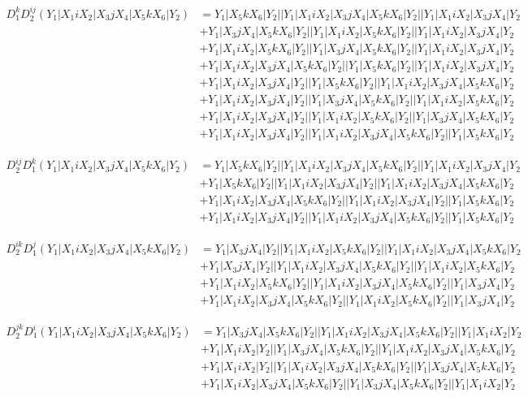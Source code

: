 \documentclass{article}[12pt]
\begin{document}
\begin{align*}
D_1^kD_2^{ij}(Y_1|X_1iX_2|X_3jX_4|X_5kX_6|Y_2)& =Y_1|X_5kX_6|Y_2||Y_1|X_1iX_2|X_3jX_4|X_5kX_6|Y_2||Y_1|X_1iX_2|X_3jX_4|Y_2\\ 
 & +Y_1|X_3jX_4|X_5kX_6|Y_2||Y_1|X_1iX_2|X_5kX_6|Y_2||Y_1|X_1iX_2|X_3jX_4|Y_2\\ 
 & +Y_1|X_1iX_2|X_5kX_6|Y_2||Y_1|X_3jX_4|X_5kX_6|Y_2||Y_1|X_1iX_2|X_3jX_4|Y_2\\ 
 & +Y_1|X_1iX_2|X_3jX_4|X_5kX_6|Y_2||Y_1|X_5kX_6|Y_2||Y_1|X_1iX_2|X_3jX_4|Y_2\\ 
 & +Y_1|X_1iX_2|X_3jX_4|Y_2||Y_1|X_5kX_6|Y_2||Y_1|X_1iX_2|X_3jX_4|X_5kX_6|Y_2\\ 
 & +Y_1|X_1iX_2|X_3jX_4|Y_2||Y_1|X_3jX_4|X_5kX_6|Y_2||Y_1|X_1iX_2|X_5kX_6|Y_2\\ 
 & +Y_1|X_1iX_2|X_3jX_4|Y_2||Y_1|X_1iX_2|X_5kX_6|Y_2||Y_1|X_3jX_4|X_5kX_6|Y_2\\ 
 & +Y_1|X_1iX_2|X_3jX_4|Y_2||Y_1|X_1iX_2|X_3jX_4|X_5kX_6|Y_2||Y_1|X_5kX_6|Y_2\end{align*}

\begin{align*}
D_2^{ij}D_1^k(Y_1|X_1iX_2|X_3jX_4|X_5kX_6|Y_2)& =Y_1|X_5kX_6|Y_2||Y_1|X_1iX_2|X_3jX_4|X_5kX_6|Y_2||Y_1|X_1iX_2|X_3jX_4|Y_2\\ 
 & +Y_1|X_5kX_6|Y_2||Y_1|X_1iX_2|X_3jX_4|Y_2||Y_1|X_1iX_2|X_3jX_4|X_5kX_6|Y_2\\ 
 & +Y_1|X_1iX_2|X_3jX_4|X_5kX_6|Y_2||Y_1|X_1iX_2|X_3jX_4|Y_2||Y_1|X_5kX_6|Y_2\\ 
 & +Y_1|X_1iX_2|X_3jX_4|Y_2||Y_1|X_1iX_2|X_3jX_4|X_5kX_6|Y_2||Y_1|X_5kX_6|Y_2\end{align*}

\begin{align*}
D_2^{ik}D_1^j(Y_1|X_1iX_2|X_3jX_4|X_5kX_6|Y_2)& =Y_1|X_3jX_4|Y_2||Y_1|X_1iX_2|X_5kX_6|Y_2||Y_1|X_1iX_2|X_3jX_4|X_5kX_6|Y_2\\ 
 & +Y_1|X_3jX_4|Y_2||Y_1|X_1iX_2|X_3jX_4|X_5kX_6|Y_2||Y_1|X_1iX_2|X_5kX_6|Y_2\\ 
 & +Y_1|X_1iX_2|X_5kX_6|Y_2||Y_1|X_1iX_2|X_3jX_4|X_5kX_6|Y_2||Y_1|X_3jX_4|Y_2\\ 
 & +Y_1|X_1iX_2|X_3jX_4|X_5kX_6|Y_2||Y_1|X_1iX_2|X_5kX_6|Y_2||Y_1|X_3jX_4|Y_2\end{align*}

\begin{align*}
D_2^{jk}D_1^i(Y_1|X_1iX_2|X_3jX_4|X_5kX_6|Y_2)& =Y_1|X_3jX_4|X_5kX_6|Y_2||Y_1|X_1iX_2|X_3jX_4|X_5kX_6|Y_2||Y_1|X_1iX_2|Y_2\\ 
 & +Y_1|X_1iX_2|Y_2||Y_1|X_3jX_4|X_5kX_6|Y_2||Y_1|X_1iX_2|X_3jX_4|X_5kX_6|Y_2\\ 
 & +Y_1|X_1iX_2|Y_2||Y_1|X_1iX_2|X_3jX_4|X_5kX_6|Y_2||Y_1|X_3jX_4|X_5kX_6|Y_2\\ 
 & +Y_1|X_1iX_2|X_3jX_4|X_5kX_6|Y_2||Y_1|X_3jX_4|X_5kX_6|Y_2||Y_1|X_1iX_2|Y_2\end{align*}
\end{document}
